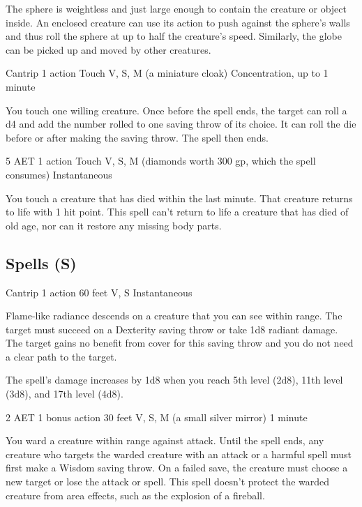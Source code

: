The sphere is weightless and just large enough to contain the creature or object inside. An enclosed creature can use its action to push against the sphere's walls and thus roll the sphere at up to half the creature's speed. Similarly, the globe can be picked up and moved by other creatures.

\label{spell:resistance}
{Cantrip}
{1 action}
{Touch}
{V, S, M (a miniature cloak)}
{Concentration, up to 1 minute}

You touch one willing creature. Once before the spell ends, the target can roll a d4 and add the number rolled to one saving throw of its choice. It can roll the die before or after making the saving throw. The spell then ends.

\label{spell:revivify}
{5 AET}
{1 action}
{Touch}
{V, S, M (diamonds worth 300 gp, which the spell consumes)}
{Instantaneous}

You touch a creature that has died within the last minute. That creature returns to life with 1 hit point. This spell can't return to life a creature that has died of old age, nor can it restore any missing body parts.

\subsection{Spells (S)}

\label{spell:sacred-flame}
{Cantrip}
{1 action}
{60 feet}
{V, S}
{Instantaneous}

Flame-like radiance descends on a creature that you can see within range. The target must succeed on a Dexterity saving throw or take 1d8 radiant damage. The target gains no benefit from cover for this saving throw and you do not need a clear path to the target.

The spell's damage increases by 1d8 when you reach 5th level (2d8), 11th level (3d8), and 17th level (4d8).

\label{spell:sanctuary}
{2 AET}
{1 bonus action}
{30 feet}
{V, S, M (a small silver mirror)}
{1 minute}

You ward a creature within range against attack. Until the spell ends, any creature who targets the warded creature with an attack or a harmful spell must first make a Wisdom saving throw. On a failed save, the creature must choose a new target or lose the attack or spell. This spell doesn't protect the warded creature from area effects, such as the explosion of a fireball.

